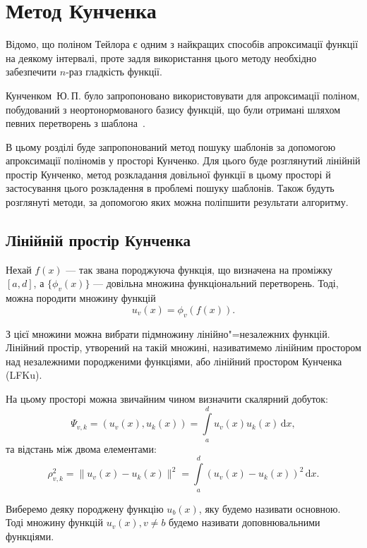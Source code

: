 \chapter{Метод Кунченка}
\label{chap:selected}

Відомо, що поліном Тейлора є одним з найкращих способів апроксимації функції на деякому інтервалі, проте задля
використання цього методу необхідно забезпечити $n$-раз гладкість функції.

Кунченком~Ю.\,П. було запропоновано використовувати для апроксимації поліном, побудований з неортонормованого базису
функцій, що були отримані шляхом певних перетворень з шаблона~\cite{book6}.

В цьому розділі буде запропонований метод пошуку шаблонів за допомогою апроксимації поліномів у просторі Кунченко.
Для цього буде розглянутий лінійній простір Кунченко, метод розкладання довільної функції в цьому просторі й
застосування цього розкладення в проблемі пошуку шаблонів.
Також будуть розглянуті методи, за допомогою яких можна поліпшити результати алгоритму.

\section{Лінійній простір Кунченка}
    Нехай $f(x)$ --- так звана породжуюча функція, що визначена на проміжку ${[a, d]}$, а $\{ \phi_v( x ) \}$ ---
    довільна множина функціональний перетворень.
    Тоді, можна породити множину функцій
    \begin{equation}
        u_v(x) = \phi_v( f( x )).
    \end{equation}

    З цієї множини можна вибрати підмножину лінійно"=незалежних функцій.
    Лінійний простір, утворений на такій множині, називатимемо лінійним простором над незалежними породженими
    функціями, або лінійний простором Кунченка (LFKu).

    На цьому просторі можна звичайним чином визначити скалярний добуток:
    \begin{equation}
        \Psi_{v,k} = (u_v( x ), u_k( x ) ) = \int\limits_a^d u_v( x ) u_k( x )\,\mathrm{d}x,
    \end{equation}
    та відстань між двома елементами:
    \begin{equation}
        \rho_{v,k}^2 = \|u_v( x ) - u_k( x )\|^2 = \int\limits_a^d\left(u_v(x) - u_k(x)\right)^2\,\mathrm{d}x.
    \end{equation}

    Виберемо деяку породжену функцію $u_b(x)$, яку будемо називати основною.
    Тоді множину функцій $u_v(x), v \ne b$ будемо називати доповнювальними функціями.

